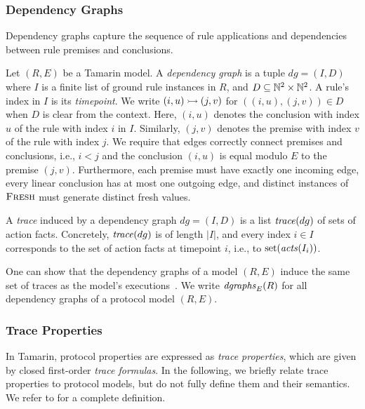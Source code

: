 \subsubsection{Dependency Graphs}

Dependency graphs capture the sequence of rule applications and dependencies between rule premises and conclusions.

\begin{definition} \label{def:dependency-graph}
  Let $(R, E)$ be a Tamarin model.
  A \emph{dependency graph} is a tuple $dg = (I, D)$ where $I$ is a finite list of ground rule instances in $R$, and $D \subseteq \mathbb{N}^2 \times \mathbb{N}^2$.
  A rule's index in $I$ is its \emph{timepoint}.
  We write $(i,u) \rightarrowtail (j,v)$ for $((i,u), (j,v)) \in D$ when $D$ is clear from the context.
  Here, $(i, u)$ denotes the conclusion with index $u$ of the rule with index $i$ in $I$.
  Similarly, $(j,v)$ denotes the premise with index $v$ of the rule with index $j$.
  We require that edges correctly connect premises and conclusions, i.e., $i < j$ and the conclusion $(i, u)$ is equal modulo $E$ to the premise $(j, v)$.
  Furthermore, each premise must have exactly one incoming edge, every linear conclusion has at most one outgoing edge, and distinct instances of $\textnormal{\textsc{Fresh}}$ must generate distinct fresh values.
\end{definition}

\begin{definition}[Trace]
  A \emph{trace} induced by a dependency graph $dg = (I, D)$ is a list $\mathit{trace}(dg)$ of sets of action facts.
  Concretely, $\mathit{trace}(dg)$ is of length $|I|$, and every index $i \in I$ corresponds to the set of action facts at timepoint $i$, i.e., to $\mathrm{set}(\mathit{acts}(I_i))$.
\end{definition}

One can show that the dependency graphs of a model $(R,E)$ induce the same set of traces as the model's executions~\cite[Theorem~3]{TamarinThesisInduction}.
We write $\mathit{dgraphs}_E(R)$ for all dependency graphs of a protocol model $(R, E)$.

\subsubsection{Trace Properties}

In Tamarin, protocol properties are expressed as \emph{trace properties}, which are given by closed first-order \emph{trace formulas}.
In the following, we briefly relate trace properties to protocol models, but do not fully define them and their semantics.
We refer to \cite{TamarinThesisInduction} for a complete definition.

